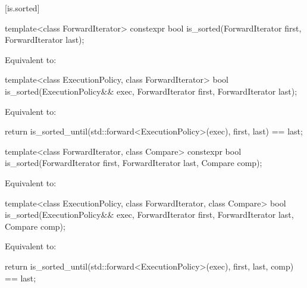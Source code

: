 [is.sorted]{}

%
\begin{itemdecl}
template<class ForwardIterator>
  constexpr bool is_sorted(ForwardIterator first, ForwardIterator last);
\end{itemdecl}

\begin{itemdescr}
\pnum
\effects
Equivalent to: 
\end{itemdescr}

%
\begin{itemdecl}
template<class ExecutionPolicy, class ForwardIterator>
  bool is_sorted(ExecutionPolicy&& exec,
                 ForwardIterator first, ForwardIterator last);
\end{itemdecl}

\begin{itemdescr}
\pnum
\effects
Equivalent to:
\begin{codeblock}
return is_sorted_until(std::forward<ExecutionPolicy>(exec), first, last) == last;
\end{codeblock}
\end{itemdescr}

%
\begin{itemdecl}
template<class ForwardIterator, class Compare>
  constexpr bool is_sorted(ForwardIterator first, ForwardIterator last,
                           Compare comp);
\end{itemdecl}

\begin{itemdescr}
\pnum
\effects
Equivalent to: 
\end{itemdescr}


%
\begin{itemdecl}
template<class ExecutionPolicy, class ForwardIterator, class Compare>
  bool is_sorted(ExecutionPolicy&& exec,
                 ForwardIterator first, ForwardIterator last,
                 Compare comp);
\end{itemdecl}

\begin{itemdescr}
\pnum
\effects
Equivalent to:
\begin{codeblock}
return is_sorted_until(std::forward<ExecutionPolicy>(exec), first, last, comp) == last;
\end{codeblock}
\end{itemdescr}

